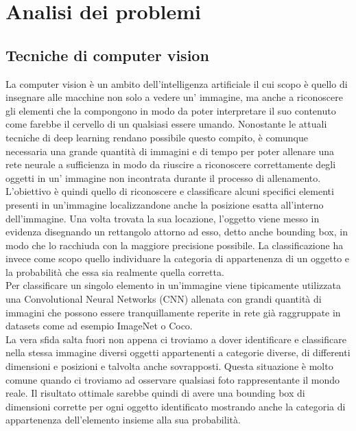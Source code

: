 \section{Analisi dei problemi}
\subsection{Tecniche di computer vision}
La computer vision è un ambito dell'intelligenza artificiale il cui scopo è quello di insegnare alle macchine non solo a vedere un' immagine, ma anche a riconoscere gli elementi che la compongono in modo da poter interpretare il suo contenuto come farebbe il cervello di un qualsiasi essere umando. Nonostante le attuali tecniche di deep learning rendano possibile questo compito, è comunque necessaria una grande quantità di immagini e di tempo per poter allenare una rete neurale a sufficienza in modo da riuscire a riconoscere correttamente degli oggetti in un' immagine non incontrata durante il processo di allenamento.\\
L'obiettivo è quindi quello di riconoscere e classificare alcuni specifici elementi presenti in un'immagine localizzandone anche la posizione esatta all'interno dell'immagine. Una volta trovata la sua locazione, l'oggetto viene messo in evidenza disegnando un rettangolo attorno ad esso, detto anche bounding box, in modo che lo racchiuda con la maggiore precisione possibile. La classificazione ha invece come scopo quello individuare la categoria di appartenenza di un oggetto e la probabilità che essa sia realmente quella corretta.\\
Per classificare un singolo elemento in un'immagine viene tipicamente utilizzata una Convolutional Neural Networks (CNN) allenata con grandi quantità di immagini che possono essere tranquillamente reperite in rete già raggruppate in datasets come ad esempio ImageNet o Coco.\\
La vera sfida salta fuori non appena ci troviamo a dover identificare e classificare nella stessa immagine diversi oggetti appartenenti a categorie diverse, di differenti dimensioni e posizioni e talvolta anche sovrapposti. Questa situazione è molto comune quando ci troviamo ad osservare qualsiasi foto rappresentante il mondo reale. Il risultato ottimale sarebbe quindi di avere una bounding box di dimensioni corrette per ogni oggetto identificato mostrando anche la categoria di appartenenza dell'elemento insieme alla sua probabilità.
